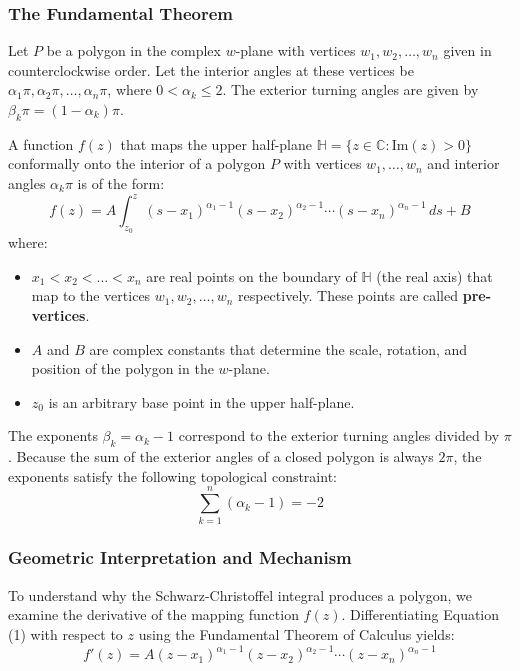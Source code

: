 \documentclass[12pt,a4paper]{article}
\begin{document}
\subsubsection{The Fundamental Theorem}
Let $P$ be a polygon in the complex $w$-plane with vertices $w_1, w_2, \dots, w_n$ given in counterclockwise order. Let the interior angles at these vertices be $\alpha_1 \pi, \alpha_2 \pi, \dots, \alpha_n \pi$, where $0 < \alpha_k \le 2$. The exterior turning angles are given by $\beta_k \pi = (1 - \alpha_k)\pi$.

A function $f(z)$ that maps the upper half-plane $\mathbb{H} = \{z \in \mathbb{C} : \text{Im}(z) > 0\}$ conformally onto the interior of a polygon $P$ with vertices $w_1, \dots, w_n$ and interior angles $\alpha_k\pi$ is of the form:
\begin{equation}
    f(z) = A \int_{z_0}^{z} (s - x_1)^{\alpha_1 - 1} (s - x_2)^{\alpha_2 - 1} \cdots (s - x_n)^{\alpha_n - 1} \, ds + B
\end{equation}
where:
\begin{itemize}
    \item $x_1 < x_2 < \dots < x_n$ are real points on the boundary of $\mathbb{H}$ (the real axis) that map to the vertices $w_1, w_2, \dots, w_n$ respectively. These points are called \textbf{pre-vertices}.
    \item $A$ and $B$ are complex constants that determine the scale, rotation, and position of the polygon in the $w$-plane.
    \item $z_0$ is an arbitrary base point in the upper half-plane.
\end{itemize}

The exponents $\beta_k = \alpha_k - 1$ correspond to the exterior turning angles divided by $\pi$. Because the sum of the exterior angles of a closed polygon is always $2\pi$, the exponents satisfy the following topological constraint:
\begin{equation}
    \sum_{k=1}^{n} (\alpha_k - 1) = -2
\end{equation}

\subsubsection{Geometric Interpretation and Mechanism}
To understand why the Schwarz-Christoffel integral produces a polygon, we examine the derivative of the mapping function $f(z)$. Differentiating Equation (1) with respect to $z$ using the Fundamental Theorem of Calculus yields:
\begin{equation}
    f'(z) = A (z - x_1)^{\alpha_1 - 1} (z - x_2)^{\alpha_2 - 1} \cdots (z - x_n)^{\alpha_n - 1}
\end{equation}
\end{document}
